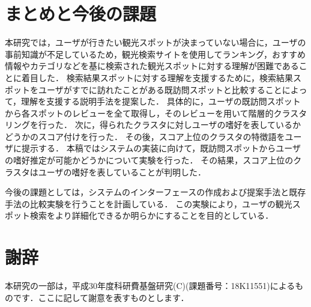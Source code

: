 \documentclass{deimj}
\begin{document}
\section{まとめと今後の課題}
\label{sec:まとめと今後の課題}

本研究では，ユーザが行きたい観光スポットが決まっていない場合に，ユーザの事前知識が不足しているため，観光検索サイトを使用してランキング，おすすめ情報やカテゴリなどを基に検索された観光スポットに対する理解が困難であることに着目した．
検索結果スポットに対する理解を支援するために，検索結果スポットをユーザがすでに訪れたことがある既訪問スポットと比較することによって，理解を支援する説明手法を提案した．
具体的に，ユーザの既訪問スポットから各スポットのレビューを全て取得し，そのレビューを用いて階層的クラスタリングを行った．
次に，得られたクラスタに対しユーザの嗜好を表しているかどうかのスコア付けを行った．
その後，スコア上位のクラスタの特徴語をユーザに提示する．
本稿ではシステムの実装に向けて，既訪問スポットからユーザの嗜好推定が可能かどうかについて実験を行った．
その結果，スコア上位のクラスタはユーザの嗜好を表していることが判明した．

今後の課題としては，システムのインターフェースの作成および提案手法と既存手法の比較実験を行うことを計画している．
この実験により，ユーザの観光スポット検索をより詳細化できるか明らかにすることを目的としている．

\section*{謝辞}
本研究の一部は，平成30年度科研費基盤研究(C)(課題番号：18K11551)によるものです．ここに記して謝意を表すものとします．
\end{document}
